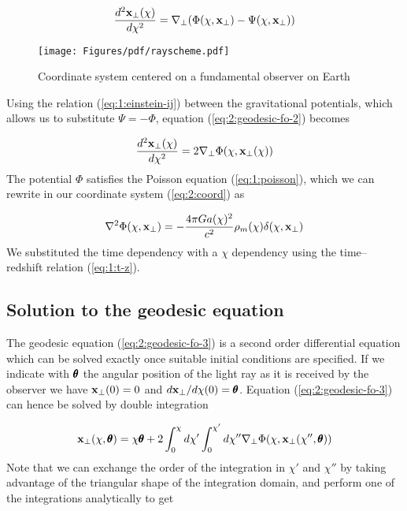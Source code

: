 \begin{equation}
\label{eq:2:geodesic-fo-2}
\frac{d^2\mathbf{x}_\perp(\chi)}{d\chi^2} = \nabla_\perp(\Phi(\chi,\mathbf{x}_\perp)-\Psi(\chi,\mathbf{x}_\perp))
\end{equation}
%
\begin{figure}
\begin{center}
\texttt{[image: Figures/pdf/rayscheme.pdf]}
\end{center}
\caption{Coordinate system centered on a fundamental observer on Earth}
\label{fig:2:scheme}
\end{figure}
%
Using the relation (\ref{eq:1:einstein-ij}) between the gravitational potentials, which allows us to substitute $\Psi=-\Phi$, equation (\ref{eq:2:geodesic-fo-2}) becomes 

\begin{equation}
\label{eq:2:geodesic-fo-3}
\frac{d^2\mathbf{x}_\perp(\chi)}{d\chi^2} = 2\nabla_\perp\Phi(\chi,\mathbf{x}_\perp(\chi))
\end{equation}
%
The potential $\Phi$ satisfies the Poisson equation (\ref{eq:1:poisson}), which we can rewrite in our coordinate system (\ref{eq:2:coord}) as

\begin{equation}
\label{eq:2:poisson}
\nabla^2\Phi(\chi,\mathbf{x}_\perp) = -\frac{4\pi Ga(\chi)^2}{c^2}\rho_m(\chi)\delta(\chi,\mathbf{x}_\perp)
\end{equation} 
%
We substituted the time dependency with a $\chi$ dependency using the time--redshift relation (\ref{eq:1:t-z}). 

\subsection{Solution to the geodesic equation}
The geodesic equation (\ref{eq:2:geodesic-fo-3}) is a second order differential equation which can be solved exactly once suitable initial conditions are specified. If we indicate with $\pmb{\theta}$ the angular position of the light ray as it is received by the observer we have $\mathbf{x}_\perp(0)=0$ and $d\mathbf{x}_\perp /d\chi(0)=\pmb{\theta}$. Equation (\ref{eq:2:geodesic-fo-3}) can hence be solved by double integration

\begin{equation}
\label{eq:2:geosol-1}
\mathbf{x}_\perp(\chi,\pmb{\theta}) = \chi\pmb{\theta} + 2\int_0^\chi d\chi'\int_0^{\chi'}d\chi'' \nabla_\perp\Phi(\chi,\mathbf{x}_\perp(\chi'',\pmb{\theta}))
\end{equation} 
%
Note that we can exchange the order of the integration in $\chi'$ and $\chi''$ by taking advantage of the triangular shape of the integration domain, and perform one of the integrations analytically to get

